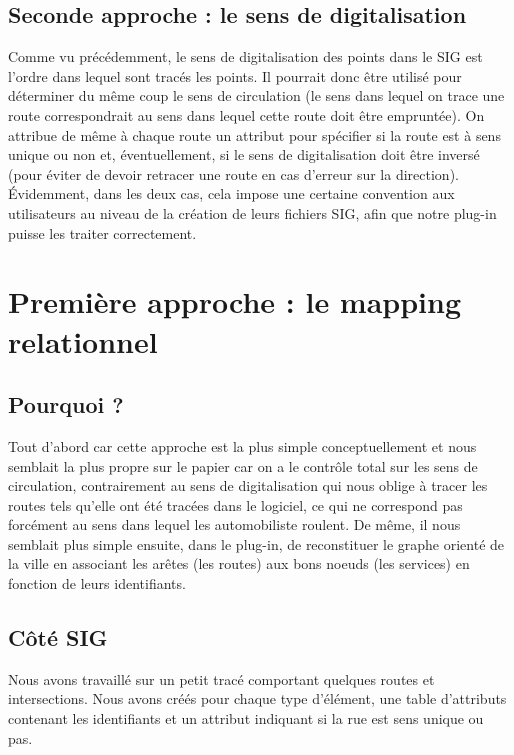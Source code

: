 \documentclass[11pt]{report} %
\begin{document}
\subsection{Seconde approche : le sens de digitalisation}
Comme vu pr\'ec\'edemment, le sens de digitalisation des points dans le SIG est l'ordre dans lequel sont trac\'es les points. Il pourrait donc \^etre utilis\'e pour d\'eterminer du m\^eme coup le sens de circulation (le sens dans lequel on trace une route correspondrait au sens dans lequel cette route doit \^etre emprunt\'ee). On attribue de m\^eme \`a chaque route un attribut pour sp\'ecifier si la route est \`a sens unique ou non et, \'eventuellement, si le sens de digitalisation doit \^etre invers\'e (pour \'eviter de devoir retracer une route en cas d'erreur sur la direction).\\
Évidemment, dans les deux cas, cela impose une certaine convention aux utilisateurs au niveau de la cr\'eation de leurs fichiers SIG, afin que notre plug-in puisse les traiter correctement.

\section{Premi\`ere approche : le mapping relationnel}
\subsection{Pourquoi ?}
Tout d'abord car cette approche est la plus simple conceptuellement et nous semblait la plus \og propre  \fg{} sur le papier car on a le contrôle total sur les sens de circulation, contrairement au sens de digitalisation qui nous oblige \`a tracer les routes tels qu'elle ont \'et\'e trac\'ees dans le logiciel, ce qui ne correspond pas forc\'ement au sens dans lequel les automobiliste roulent. De m\^eme, il nous semblait plus simple ensuite, dans le plug-in, de reconstituer le graphe orient\'e de la ville en associant les ar\^etes (les routes) aux bons noeuds (les services) en fonction de leurs identifiants.

\subsection{Côt\'e SIG}
Nous avons travaill\'e sur un petit trac\'e comportant quelques routes et intersections. Nous avons cr\'e\'es  pour chaque type d'\'el\'ement, une table d'attributs contenant les identifiants et un attribut indiquant si la rue est sens unique ou pas.
\end{document}
